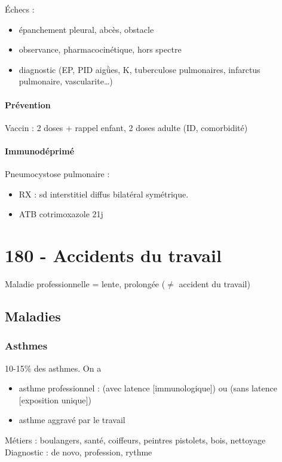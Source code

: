 \documentclass{book}
\begin{document}
Échecs : 
\begin{itemize}
\item épanchement pleural, abcès, obstacle
\item observance, pharmacocinétique, hors spectre
\item diagnostic (EP, PID aigǜes, K, tuberculose pulmonaires, infarctus pulmonaire, vascularite\ldots{})
\end{itemize}

\paragraph{Prévention}
\label{sec:org38aaeba}
Vaccin : 2 doses + rappel enfant, 2 doses adulte (ID, comorbidité)

\paragraph{Immunodéprimé}
\label{sec:orge758551}
Pneumocystose pulmonaire : 

\begin{itemize}
\item RX : sd interstitiel diffus bilatéral symétrique.
\item ATB cotrimoxazole 21j
\end{itemize}

\section{180 \textdagger{} - Accidents du travail}
\label{sec:org41bdb49}
Maladie professionnelle = lente, prolongée (\(\neq\) accident du travail)
\subsection{Maladies}
\label{sec:org18ff455}
\subsubsection{Asthmes}
\label{sec:org11f1e5b}
10-15\% des asthmes. On a

\begin{itemize}
\item asthme professionnel : (avec latence [immunologique]) ou (sans latence
[exposition unique])
\item asthme aggravé par le travail
\end{itemize}

Métiers : boulangers, santé, coiffeurs, peintres pistolets, bois, nettoyage\\
Diagnostic : de novo, profession, rythme
\end{document}
